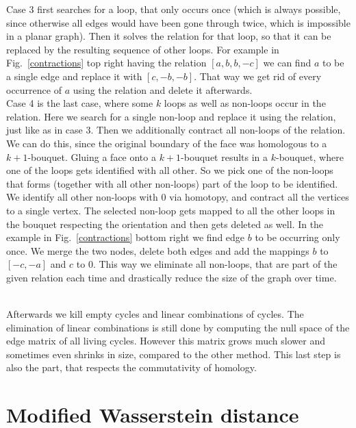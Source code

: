 \documentclass[11pt, a4paper, UKenglish]{article}
\begin{document}
    Case 3 first searches for a loop, that only occurs once (which is always possible, since otherwise all edges would have been gone through twice, which is impossible in a planar graph).
    Then it solves the relation for that loop, so that it can be replaced by the resulting sequence of other loops.
    For example in Fig.\ \ref{contractions} top right having the relation $[a, b, b, -c]$ we can find $a$ to be a single edge and replace it with $[c, -b, -b]$.
    That way we get rid of every occurrence of $a$ using the relation and delete it afterwards.\\
    Case 4 is the last case, where some $k$ loops as well as non-loops occur in the relation.
    Here we search for a single non-loop and replace it using the relation, just like as in case 3.
    Then we additionally contract all non-loops of the relation. We can do this, since the original boundary of the face was homologous to a $k+1$-bouquet.
    Gluing a face onto a $k+1$-bouquet results in a $k$-bouquet, where one of the loops gets identified with all other.
    So we pick one of the non-loops that forms (together with all other non-loops) part of the loop to be identified.
    We identify all other non-loops with $0$ via homotopy, and contract all the vertices to a single vertex.
    The selected non-loop gets mapped to all the other loops in the bouquet respecting the orientation and then gets deleted as well.
    In the example in Fig.\ \ref{contractions} bottom right we find edge $b$ to be occurring only once.
    We merge the two nodes, delete both edges and add the mappings $b$ to $[-c,-a]$ and $c$ to $0$.
    This way we eliminate all non-loops, that are part of the given relation each time and drastically reduce the size of the graph over time.
    
    \\
    Afterwards we kill empty cycles and linear combinations of cycles.
    The elimination of linear combinations is still done by computing the null space of the edge matrix of all living cycles.
    However this matrix grows much slower and sometimes even shrinks in size, compared to the other method.
    This last step is also the part, that respects the commutativity of homology.

    \section{Modified Wasserstein distance}\label{sec:distance-measures}
\end{document}
